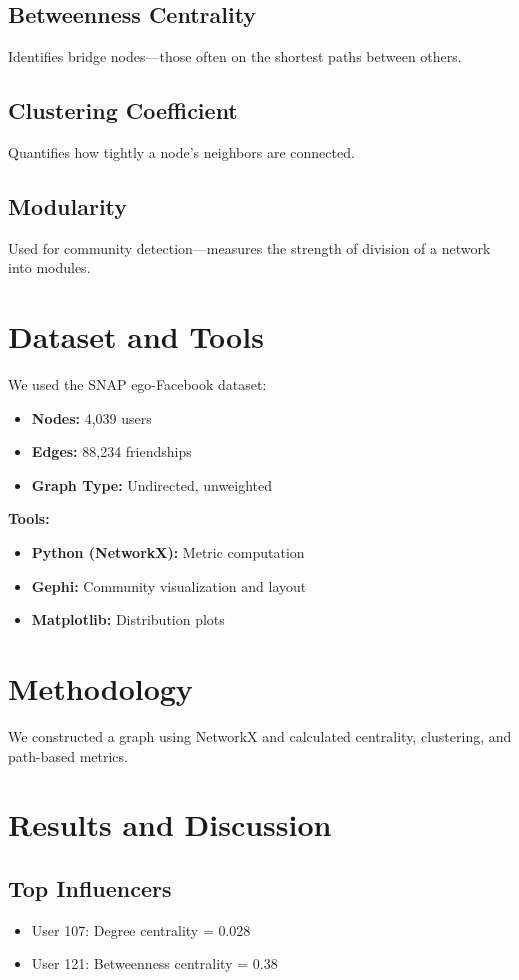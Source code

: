 \documentclass[conference]{IEEEtran}
\begin{document}
\subsection{Betweenness Centrality}
Identifies bridge nodes—those often on the shortest paths between others.

\subsection{Clustering Coefficient}
Quantifies how tightly a node's neighbors are connected.

\subsection{Modularity}
Used for community detection—measures the strength of division of a network into modules.

\section{Dataset and Tools}
We used the SNAP ego-Facebook dataset:
\begin{itemize}
  \item \textbf{Nodes:} 4,039 users
  \item \textbf{Edges:} 88,234 friendships
  \item \textbf{Graph Type:} Undirected, unweighted
\end{itemize}

\textbf{Tools:}
\begin{itemize}
  \item \textbf{Python (NetworkX):} Metric computation
  \item \textbf{Gephi:} Community visualization and layout
  \item \textbf{Matplotlib:} Distribution plots
\end{itemize}

\section{Methodology}
We constructed a graph using NetworkX and calculated centrality, clustering, and path-based metrics.

\section{Results and Discussion}
\subsection{Top Influencers}
\begin{itemize}
  \item User 107: Degree centrality = 0.028
  \item User 121: Betweenness centrality = 0.38
\end{itemize}
\end{document}

